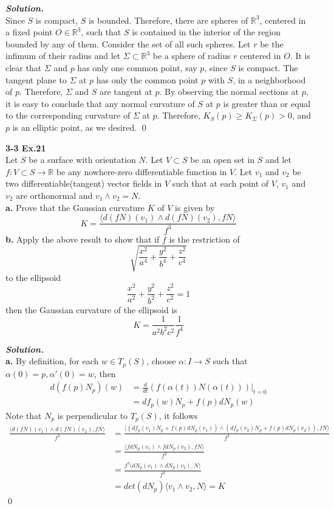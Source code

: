 \documentclass{article}
\begin{document}
\par
\textbf{\textit{Solution.}}\\
Since $S$ is compact, $S$ is bounded. Therefore, there are spheres of
$\mathbb{R}^3$, centered in a fixed point $O \in \mathbb{R}^3$, such
that $S$ is contained in the interior of the region bounded by any of
them. Consider the set of all such spheres. Let $r$ be the infimum of
their radius and let $\Sigma \subset \mathbb{R}^3$ be a sphere of
radius $r$ centered in $O$. It is clear that $\Sigma$ and $p$ has only
one common point, say $p$, since $S$ is compact. The tangent plane to
$\Sigma$ at $p$ has only the common point $p$ with $S$, in a 
neighborhood of $p$. Therefore, $\Sigma$ and $S$ are tangent at $p$.
By observing the normal sections at $p$, it is easy to conclude that
any normal curvature of $S$ at $p$ is greater than or equal to the
corresponding curvature of $\Sigma$ at $p$. Therefore,
$K_S(p) \geq K_\Sigma(p) > 0$, and $p$ is an elliptic point, as we
desired. \qed

\par
\textbf{3-3 Ex.21}\\
Let $S$ be a surface with orientation $N$. Let $V \subset S$ be an open set in $S$
and let $f:V \subset S \to \mathbb{R}$ be any nowhere-zero differentiable function
in $V$. Let $v_1$ and $v_2$ be two differentiable(tangent) vector fields in $V$
such that at each point of $V$, $v_1$ and $v_2$ are orthonormal and $v_1 \wedge v_2 = N$.\\
\textbf{a. }Prove that the Gaussian curvature $K$ of $V$ is given by
$$
    K = \frac{\langle d(fN)(v_1) \wedge d(fN)(v_2), fN \rangle}{f^3}
$$
\textbf{b. }Apply the above result to show that if $f$ is the restriction of
$$
    \sqrt{\frac{x^2}{a^4}+\frac{y^2}{b^4}+\frac{z^2}{c^4}}
$$
to the ellipsoid
$$
    \frac{x^2}{a^2} + \frac{y^2}{b^2} + \frac{z^2}{c^2} = 1
$$
then the Gaussian curvature of the ellipsoid is
$$
    K = \frac{1}{a^2b^2c^2}\frac{1}{f^4}
$$

\par
\textbf{\textit{Solution.}}\\
\textbf{a. }By definition, for each $w \in T_p(S)$, choose
$\alpha: I \to S$ such that $\alpha(0)=p, \alpha'(0)=w$, then
$$
\begin{aligned}
    d(f(p)N_p)(w) &= \frac{d}{dt}(f(\alpha(t))N(\alpha(t)))|_{t=0}\\
    &= df_p(w)N_p + f(p)dN_p(w)
\end{aligned}
$$
Note that $N_p$ is perpendicular to $T_p(S)$, it follows
$$
\begin{aligned}
    \frac{\langle d(fN)(v_1) \wedge d(fN)(v_2), fN\rangle}{f^3}
    &= \frac{\langle (df_p(v_1)N_p + f(p)dN_p(v_1))\wedge (df_p(v_2)N_p + f(p)dN_p(v_2)), fN\rangle}{f^3}\\
    &= \frac{\langle fdN_p(v_1)\wedge fdN_p(v_2), fN\rangle}{f^3}\\
    &= \frac{f^3\langle dN_p(v_1) \wedge dN_p(v_2), N\rangle}{f^3}\\
    &= det(dN_p)\langle v_1 \wedge v_2, N\rangle = K
\end{aligned}
$$
\qed
\end{document}

